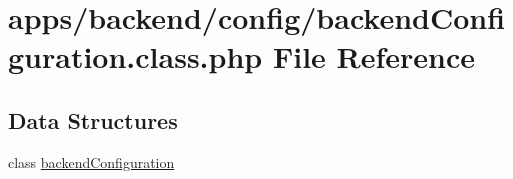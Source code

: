 \hypertarget{backend_configuration_8class_8php}{\section{apps/backend/config/backend\-Configuration.class.\-php File Reference}
\label{backend_configuration_8class_8php}
}
\subsection*{Data Structures}
\begin{DoxyCompactItemize}
\item 
class \hyperlink{classbackend_configuration}{backend\-Configuration}
\end{DoxyCompactItemize}
